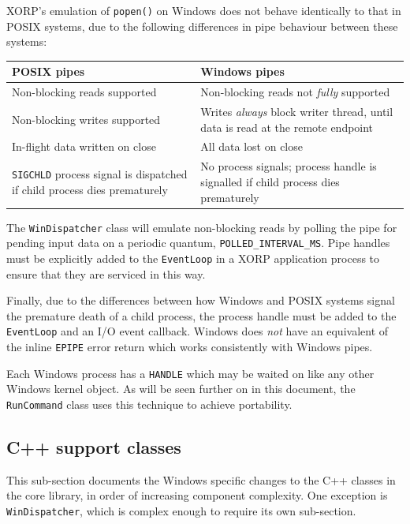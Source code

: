 \documentclass[11pt]{article}
\begin{document}
XORP's emulation of {\tt popen()} on Windows does not behave identically to that in POSIX
systems, due to the following differences in pipe behaviour between these systems:
\begin{center}
\begin{tabular}{ | p{5cm} | p{5cm} | }
 \hline
POSIX pipes & Windows pipes \\ \hline\hline
  Non-blocking reads supported &
  Non-blocking reads not {\em fully} supported \\ \hline

  Non-blocking writes supported &
  Writes {\em always} block writer thread, until data is read at the remote endpoint \\  \hline

  In-flight data written on close &
  All data lost on close \\  \hline

  {\tt SIGCHLD} process signal is dispatched if child process dies prematurely &
  No process signals; process handle is signalled if child process dies prematurely \\  \hline
\end{tabular}
\end{center}

The {\tt WinDispatcher} class will emulate
non-blocking reads by polling the pipe for pending input data
on a periodic quantum, {\tt POLLED\_INTERVAL\_MS}.
Pipe handles must be explicitly added to the {\tt EventLoop} in a XORP
application process to ensure that they are serviced in this way.

Finally, due to the differences between how Windows and POSIX systems
signal the premature death of a child process, the process handle must
be added to the {\tt EventLoop} and an I/O event callback. Windows
does {\em not} have an equivalent of the inline {\tt EPIPE} error
return which works consistently with Windows pipes.

Each Windows process has a {\tt HANDLE} which may be
waited on like any other Windows kernel object.
As will be seen further on in this document, the {\tt RunCommand} class
uses this technique to achieve portability.

\subsection{C++ support classes}

This sub-section documents the Windows specific changes to the
C++ classes in the core library, in order of increasing
component complexity.
One exception is
{\tt WinDispatcher}, which is complex enough to require
its own sub-section.
\end{document}
